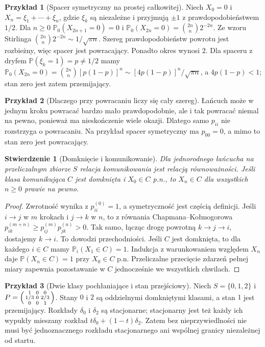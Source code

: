 \documentclass[11pt,a4paper,oneside]{report}
\numberwithin{equation}{chapter}
\theoremstyle{plain}
\newtheorem{stwierdzenie}[twierdzenie]{Stwierdzenie}
\theoremstyle{definition}
\newtheorem{przyklad}{Przykład}[chapter]
\theoremstyle{remark}
\newcommand{\Prob}{\mathbb{P}}
\begin{document}
\begin{przyklad}[Spacer symetryczny na prostej całkowitej]
Niech $X_0=0$ i $X_n=\xi_1+\cdots+\xi_n$,
gdzie $\xi_k$ są niezależne i przyjmują $\pm1$
z prawdopodobieństwem $1/2$. Dla $n\geq0$
$\Prob_0(X_{2n+1}=0)=0$ i
$\Prob_0(X_{2n}=0)=\binom{2n}{n}2^{-2n}$.
Ze wzoru Stirlinga
$\binom{2n}{n}2^{-2n}\sim1/\sqrt{\pi n}$.
Szereg prawdopodobieństw powrotu jest rozbieżny,
więc spacer jest powracający. Ponadto okres wynosi $2$.
Dla spaceru z dryfem $\Prob(\xi_k=1)=p\ne1/2$
mamy
$\Prob_0(X_{2n}=0)=\binom{2n}{n}[p(1-p)]^n
\sim[4p(1-p)]^n/\sqrt{\pi n}$,
a $4p(1-p)<1$; stan zero jest zatem przemijający.
\end{przyklad}

\begin{przyklad}[Dlaczego przy powracaniu liczy się cały szereg]
Łańcuch może w jednym kroku powracać bardzo mało
prawdopodobnie, ale i tak powracać niemal na pewno,
ponieważ ma nieskończenie wiele okazji. Dlatego
samo $p_{ii}$ nie rozstrzyga o powracaniu.
Na przykład spacer symetryczny ma $p_{00}=0$,
a mimo to stan zero jest powracający.
\end{przyklad}


\begin{stwierdzenie}[Domknięcie i komunikowanie]
Dla jednorodnego łańcucha na przeliczalnym zbiorze $S$
relacja komunikowania jest relacją równoważności.
Jeśli klasa komunikująca $C$ jest domknięta i
$X_0\in C$ p.n., to $X_n\in C$ dla wszystkich
$n\geq0$ prawie na pewno.
\end{stwierdzenie}
\begin{proof}
Zwrotność wynika z $p_{ii}^{(0)}=1$,
a symetryczność jest częścią definicji.
Jeśli $i\to j$ w $m$ krokach i $j\to k$ w $n$,
to z równania Chapmana--Kołmogorowa
$p_{ik}^{(m+n)}\geq p_{ij}^{(m)}p_{jk}^{(n)}>0$.
Tak samo, łącząc drogę powrotną $k\to j\to i$,
dostajemy $k\to i$. To dowodzi przechodniości.
Jeśli $C$ jest domknięta, to dla każdego
$i\in C$ mamy $\Prob_i(X_1\in C)=1$.
Indukcja z warunkowaniem względem $X_n$
daje $\Prob(X_n\in C)=1$ przy $X_0\in C$ p.n.
Przeliczalne przecięcie zdarzeń pełnej miary
zapewnia pozostawanie w $C$ jednocześnie
we wszystkich chwilach. 
\end{proof}

\begin{przyklad}[Dwie klasy pochłaniające i stan przejściowy]
Niech $S=\{0,1,2\}$ i
$P=\begin{psmallmatrix}1&0&0\\ 1/3&0&2/3\\ 0&0&1\end{psmallmatrix}$.
Stany $0$ i $2$ są oddzielnymi domkniętymi klasami,
a stan $1$ jest przemijający. Rozkłady
$\delta_0$ i $\delta_2$ są stacjonarne;
stacjonarny jest też każdy ich wypukły
mieszany rozkład $t\delta_0+(1-t)\delta_2$.
Zatem bez nieprzywiedlności nie musi być
jednoznacznego rozkładu stacjonarnego ani
wspólnej granicy niezależnej od startu.
\end{przyklad}
\end{document}
